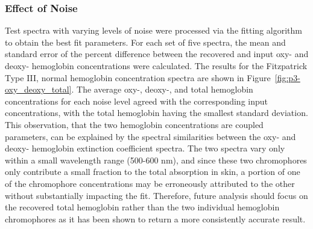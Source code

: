 \subsubsection{Effect of Noise}
Test spectra with varying levels of noise were processed via the fitting algorithm to obtain the best fit parameters. For each set of five spectra, the mean and standard error of the percent difference between the recovered and input oxy- and deoxy- hemoglobin concentrations were calculated. The results for the Fitzpatrick Type III, normal hemoglobin concentration spectra are shown in Figure~\ref{fig:p3-oxy_deoxy_total}. The average oxy-, deoxy-, and total hemoglobin concentrations for each noise level agreed with the corresponding input concentrations, with the total hemoglobin having the smallest standard deviation. This observation, that the two hemoglobin concentrations are coupled parameters, can be explained by the spectral similarities between the oxy- and deoxy- hemoglobin extinction coefficient spectra. The two spectra vary only within a small wavelength range (500-600 nm), and since these two chromophores only contribute a small fraction to the total absorption in skin, a portion of one of the chromophore concentrations may be erroneously attributed to the other without substantially impacting the fit. Therefore, future analysis should focus on the recovered total hemoglobin rather than the two individual hemoglobin chromophores as it has been shown to return a more consistently accurate result.

